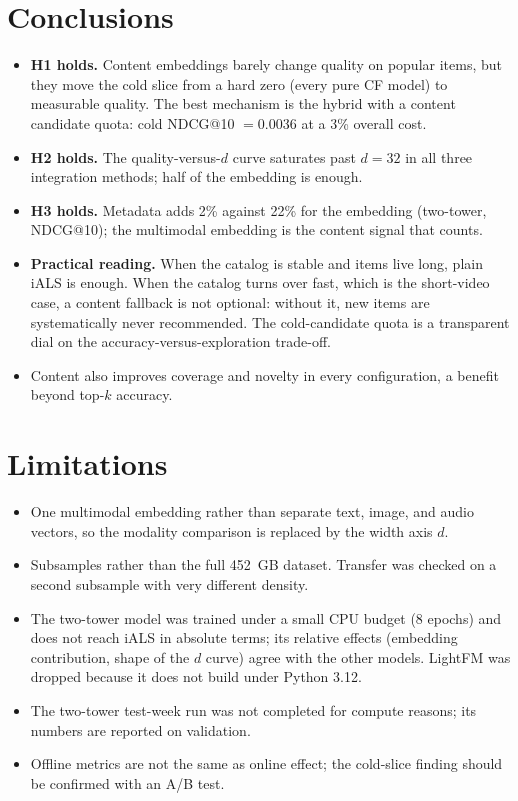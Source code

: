 \documentclass[11pt,a4paper]{article}
\begin{document}
\section{Conclusions}
\begin{itemize}
  \item \textbf{H1 holds.} Content embeddings barely change quality on popular items, but
        they move the cold slice from a hard zero (every pure CF model) to measurable
        quality. The best mechanism is the hybrid with a content candidate quota:
        cold NDCG@10 $=0.0036$ at a 3\% overall cost.
  \item \textbf{H2 holds.} The quality-versus-$d$ curve saturates past $d=32$ in all three
        integration methods; half of the embedding is enough.
  \item \textbf{H3 holds.} Metadata adds 2\% against 22\% for the embedding (two-tower,
        NDCG@10); the multimodal embedding is the content signal that counts.
  \item \textbf{Practical reading.} When the catalog is stable and items live long, plain
        iALS is enough. When the catalog turns over fast, which is the short-video case, a
        content fallback is not optional: without it, new items are systematically never
        recommended. The cold-candidate quota is a transparent dial on the
        accuracy-versus-exploration trade-off.
  \item Content also improves coverage and novelty in every configuration, a benefit
        beyond top-$k$ accuracy.
\end{itemize}

\section{Limitations}
\begin{itemize}
  \item One multimodal embedding rather than separate text, image, and audio vectors, so
        the modality comparison is replaced by the width axis $d$.
  \item Subsamples rather than the full 452~GB dataset. Transfer was checked on a second
        subsample with very different density.
  \item The two-tower model was trained under a small CPU budget (8 epochs) and does not
        reach iALS in absolute terms; its relative effects (embedding contribution, shape
        of the $d$ curve) agree with the other models. LightFM was dropped because it does
        not build under Python 3.12.
  \item The two-tower test-week run was not completed for compute reasons; its numbers are
        reported on validation.
  \item Offline metrics are not the same as online effect; the cold-slice finding should
        be confirmed with an A/B test.
\end{itemize}
\end{document}
